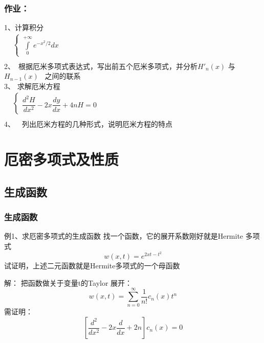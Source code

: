 \begin{frame}
	\frametitle{作业：}
	1、计算积分\\ 
	$\begin{array}{lllllllll}
		& \begin{cases}
			\int\limits_{0}^{+\infty} e^{-x^2 /2} dx
		\end{cases}\\	
	\end{array}$ \\ 
	2、 根据厄米多项式表达式，写出前五个厄米多项式，并分析$H'_n (x)$ 与$H_{n-1} (x)$  之间的联系\\
	3、 求解厄米方程\\ 
	$\begin{array}{lllllllll}
		& \begin{cases}
			\dfrac{d^2 H}{d x^2} -2x \dfrac{d y}{d x} +4n H =0 	
		\end{cases}\\	
	\end{array}$ \\ 
	4、  列出厄米方程的几种形式，说明厄米方程的特点
\end{frame}

\section{厄密多项式及性质}

\subsection{生成函数}

\begin{frame}
	\frametitle{ 生成函数 }
	\begin{exampleblock} { 例1、求厄密多项式的生成函数 }
		找一个函数，它的展开系数刚好就是Hermite 多项式
		 \begin{equation*}
			w(x,t)=e^{2xt-t^2}
		\end{equation*}
		试证明，上述二元函数就是Hermite多项式的一个母函数
	\end{exampleblock}
	\alert {解：}	把函数做关于变量t的Taylor 展开：
	\begin{equation*}
		w(x,t) =\sum_{n=0}^{\infty} \frac{1}{n!}  c_n(x) t^n
	\end{equation*}
	需证明：
	\begin{equation*}
		\left[  \frac{d^2}{dx^2} -2x\frac{d}{dx} +2n  \right] c_n(x)=0
	\end{equation*}
\end{frame}

